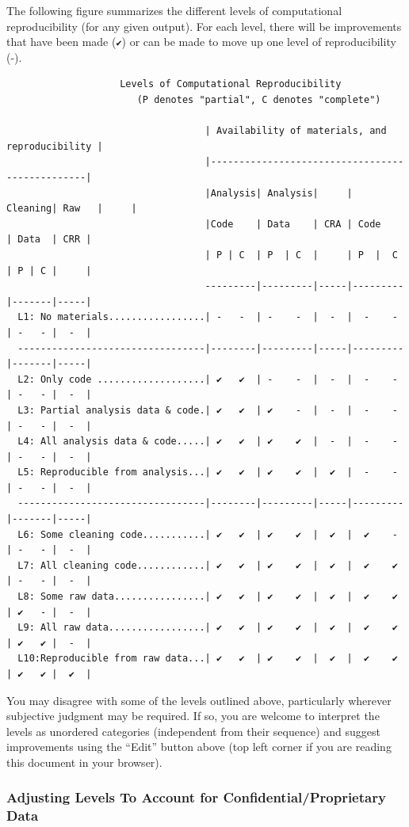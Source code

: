 \documentclass[]{book}
\begin{document}
The following figure summarizes the different levels of computational reproducibility (for any given output). For each level, there will be improvements that have been made (\texttt{✔}) or can be made to move up one level of reproducibility (-).

\begin{verbatim}
                    Levels of Computational Reproducibility
                       (P denotes "partial", C denotes "complete")

                                   | Availability of materials, and reproducibility |
                                   |------------------------------------------------|
                                   |Analysis| Analysis|     | Cleaning| Raw   |     |
                                   |Code    | Data    | CRA | Code    | Data  | CRR |
                                   | P | C  | P  | C  |     | P  |  C | P | C |     |
                                   ---------|---------|-----|---------|-------|-----|
  L1: No materials.................| -   -  | -    -  |  -  |  -    - | -   - |  -  |
  ---------------------------------|--------|---------|-----|---------|-------|-----|
  L2: Only code ...................| ✔   ✔  | -    -  |  -  |  -    - | -   - |  -  |
  L3: Partial analysis data & code.| ✔   ✔  | ✔    -  |  -  |  -    - | -   - |  -  |
  L4: All analysis data & code.....| ✔   ✔  | ✔    ✔  |  -  |  -    - | -   - |  -  |
  L5: Reproducible from analysis...| ✔   ✔  | ✔    ✔  |  ✔  |  -    - | -   - |  -  |
  ---------------------------------|--------|---------|-----|---------|-------|-----|
  L6: Some cleaning code...........| ✔   ✔  | ✔    ✔  |  ✔  |  ✔    - | -   - |  -  |
  L7: All cleaning code............| ✔   ✔  | ✔    ✔  |  ✔  |  ✔    ✔ | -   - |  -  |
  L8: Some raw data................| ✔   ✔  | ✔    ✔  |  ✔  |  ✔    ✔ | ✔   - |  -  |
  L9: All raw data.................| ✔   ✔  | ✔    ✔  |  ✔  |  ✔    ✔ | ✔   ✔ |  -  |
  L10:Reproducible from raw data...| ✔   ✔  | ✔    ✔  |  ✔  |  ✔    ✔ | ✔   ✔ |  ✔  |
\end{verbatim}

You may disagree with some of the levels outlined above, particularly wherever subjective judgment may be required. If so, you are welcome to interpret the levels as unordered categories (independent from their sequence) and suggest improvements using the ``Edit'' button above (top left corner if you are reading this document in your browser).

\hypertarget{adjusting-levels-to-account-for-confidentialproprietary-data}{%
\subsubsection*{Adjusting Levels To Account for Confidential/Proprietary Data}\label{adjusting-levels-to-account-for-confidentialproprietary-data}}
\end{document}
